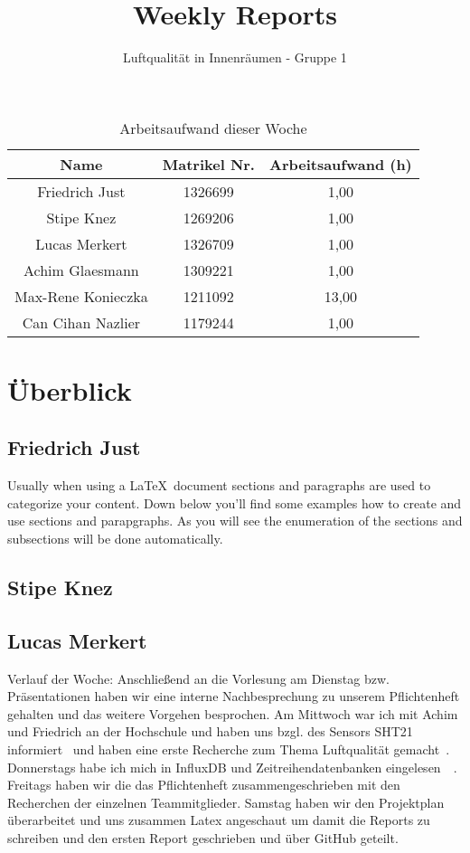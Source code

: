 \documentclass[]{article}
\title{Weekly Reports}
\author{Luftqualität in Innenräumen - Gruppe 1}
\begin{document}
\maketitle

\begin{table}[h!]
	\centering
	\begin{tabular}{|c|c|c|}
		\hline
		{\textbf{Name}}				&		{\textbf{Matrikel Nr.}} & {\textbf{Arbeitsaufwand (h)}} \\
		\hline
		Friedrich Just				&		1326699 				&	1,00	\\
		\hline
		Stipe Knez					&		1269206 				&	1,00	\\
		\hline
		Lucas Merkert				&		1326709					&	1,00	\\
		\hline
		Achim Glaesmann				&		1309221					&	1,00	\\
		\hline
		Max-Rene Konieczka			&		1211092					&	13,00	\\
		\hline
		Can Cihan Nazlier			&		1179244					&	1,00	\\
		\hline
	\end{tabular}
	\caption{Arbeitsaufwand dieser Woche}
	\label{tab:worakload}
\end{table}



\section{Überblick}


\subsection{Friedrich Just}
Usually when using a \LaTeX\ document sections and paragraphs are used to categorize your content. Down below you'll find some examples how to create and use sections and parapgraphs. As you will see the enumeration of the sections and subsections will be done automatically. 

\subsection{Stipe Knez}

\subsection{Lucas Merkert}
Verlauf der Woche: Anschließend an die Vorlesung am Dienstag bzw. Präsentationen haben wir eine interne Nachbesprechung zu unserem Pflichtenheft gehalten und das weitere Vorgehen besprochen. Am Mittwoch war ich mit Achim und Friedrich an der Hochschule und haben uns bzgl. des Sensors SHT21 informiert~\cite{datasheetsht21} und haben eine erste Recherche zum Thema Luftqualität gemacht~\cite{co2letter}. Donnerstags habe ich mich in InfluxDB und Zeitreihendatenbanken eingelesen~\cite{influxdb_sql_db}~\cite{youtube_timeseriesdatabase}. Freitags haben wir die das Pflichtenheft zusammengeschrieben mit den Recherchen der einzelnen Teammitglieder. Samstag haben wir den Projektplan überarbeitet und uns zusammen Latex angeschaut um damit die Reports zu schreiben und den ersten Report geschrieben und über GitHub geteilt.
\end{document}

